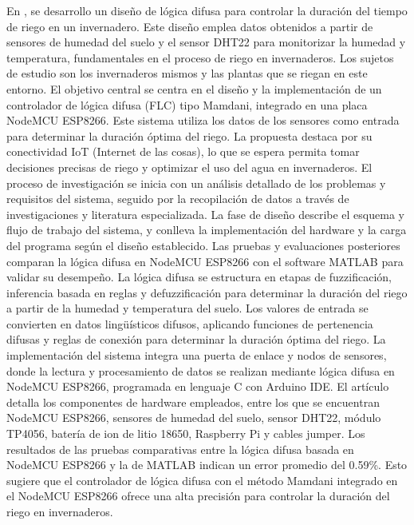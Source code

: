 \bigbreak
En \cite{widyawati_fuzzy_2022}, se desarrollo un diseño de lógica difusa para controlar la duración del tiempo de riego en un invernadero. Este diseño emplea datos obtenidos a partir de sensores de humedad del suelo y el sensor DHT22 para monitorizar la humedad y temperatura, fundamentales en el proceso de riego en invernaderos. Los sujetos de estudio son los invernaderos mismos y las plantas que se riegan en este entorno. El objetivo central se centra en el diseño y la implementación de un controlador de lógica difusa (FLC) tipo Mamdani, integrado en una placa NodeMCU ESP8266. Este sistema utiliza los datos de los sensores como entrada para determinar la duración óptima del riego. La propuesta destaca por su conectividad IoT (Internet de las cosas), lo que se espera permita tomar decisiones precisas de riego y optimizar el uso del agua en invernaderos. El proceso de investigación se inicia con un análisis detallado de los problemas y requisitos del sistema, seguido por la recopilación de datos a través de investigaciones y literatura especializada. La fase de diseño describe el esquema y flujo de trabajo del sistema, y conlleva la implementación del hardware y la carga del programa según el diseño establecido. Las pruebas y evaluaciones posteriores comparan la lógica difusa en NodeMCU ESP8266 con el software MATLAB para validar su desempeño. La lógica difusa se estructura en etapas de fuzzificación, inferencia basada en reglas y defuzzificación para determinar la duración del riego a partir de la humedad y temperatura del suelo. Los valores de entrada se convierten en datos lingüísticos difusos, aplicando funciones de pertenencia difusas y reglas de conexión para determinar la duración óptima del riego. La implementación del sistema integra una puerta de enlace y nodos de sensores, donde la lectura y procesamiento de datos se realizan mediante lógica difusa en NodeMCU ESP8266, programada en lenguaje C con Arduino IDE. El artículo detalla los componentes de hardware empleados, entre los que se encuentran NodeMCU ESP8266, sensores de humedad del suelo, sensor DHT22, módulo TP4056, batería de ion de litio 18650, Raspberry Pi y cables jumper. Los resultados de las pruebas comparativas entre la lógica difusa basada en NodeMCU ESP8266 y la de MATLAB indican un error promedio del 0.59\%. Esto sugiere que el controlador de lógica difusa con el método Mamdani integrado en el NodeMCU ESP8266 ofrece una alta precisión para controlar la duración del riego en invernaderos.

